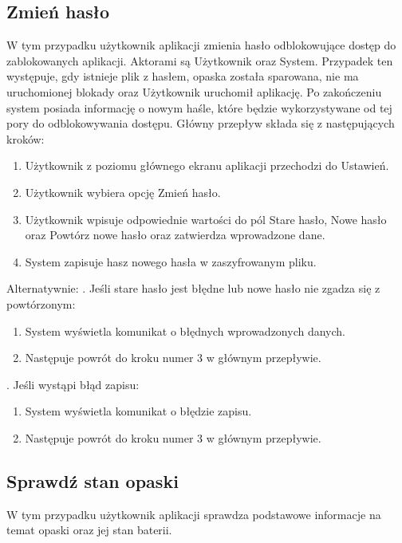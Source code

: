 \subsection{Zmień hasło}
W tym przypadku użytkownik aplikacji zmienia hasło odblokowujące dostęp do zablokowanych aplikacji. Aktorami są Użytkownik oraz System. Przypadek ten występuje, gdy istnieje plik z hasłem, opaska została sparowana, nie ma uruchomionej blokady oraz Użytkownik uruchomił aplikację. Po zakończeniu system posiada informację o nowym haśle, które będzie wykorzystywane od tej pory do odblokowywania dostępu. Główny przepływ składa się z następujących kroków:
\begin{enumerate}
    \item Użytkownik z poziomu głównego ekranu aplikacji przechodzi do Ustawień.
    \item Użytkownik wybiera opcję Zmień hasło.
    \item Użytkownik wpisuje odpowiednie wartości do pól Stare hasło, Nowe hasło oraz Powtórz nowe hasło oraz zatwierdza wprowadzone dane.
    \item System zapisuje hasz nowego hasła w zaszyfrowanym pliku.
\end{enumerate}
Alternatywnie: 
\newline\newline
{}. Jeśli stare hasło jest błędne lub nowe hasło nie zgadza się z powtórzonym:
\begin{enumerate}[leftmargin=3\parindent]
    \item System wyświetla komunikat o błędnych wprowadzonych danych.
    \item Następuje powrót do kroku numer 3 w głównym przepływie.
\end{enumerate}
\quad\newline
{}. Jeśli wystąpi błąd zapisu:
\begin{enumerate}[leftmargin=3\parindent]
    \item System wyświetla komunikat o błędzie zapisu.
    \item Następuje powrót do kroku numer 3 w głównym przepływie.
\end{enumerate}

\subsection{Sprawdź stan opaski}
W tym przypadku użytkownik aplikacji sprawdza podstawowe informacje na temat opaski oraz jej stan baterii.

